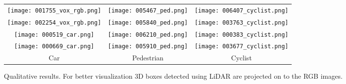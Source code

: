 \documentclass[10pt,twocolumn,letterpaper]{article}
\begin{document}
\begin{figure*}[!t]
\centering
    \begin{tabular}{ccc}
    \centering
   
\vspace{-0.30cm}
\hspace{-0.75cm} \texttt{[image: 001755\_vox\_rgb.png]} & \hspace{-1.25cm}

\texttt{[image: 005467\_ped.png]} & \hspace{-1.25cm}

\texttt{[image: 006407\_cyclist.png]} \\

\vspace{-0.30cm}

\hspace{-0.75cm} \texttt{[image: 002254\_vox\_rgb.png]} & \hspace{-1.25cm}
\texttt{[image: 005840\_ped.png]} & \hspace{-1.25cm}
\texttt{[image: 003763\_cyclist.png]} \\

\vspace{-0.30cm}

\hspace{-0.75cm} \texttt{[image: 000519\_car.png]} & \hspace{-1.25cm}
\texttt{[image: 006210\_ped.png]} & \hspace{-1.25cm}
\texttt{[image: 000383\_cyclist.png]} \\

\vspace{-0.30cm}

\hspace{-0.75cm} \texttt{[image: 000669\_car.png]} & \hspace{-1.25cm}
\texttt{[image: 005910\_ped.png]} & \hspace{-1.25cm}
\texttt{[image: 003677\_cyclist.png]} \\


        \hspace{-0.75cm} Car & \hspace{-1.25cm} Pedestrian & \hspace{-1.25cm} Cyclist \\
    \end{tabular}
\caption{Qualitative results. For better visualization  3D boxes detected using LiDAR are projected on to the RGB images.}
    \label{fig:Qualitative_demo}
\end{figure*}
\end{document}
